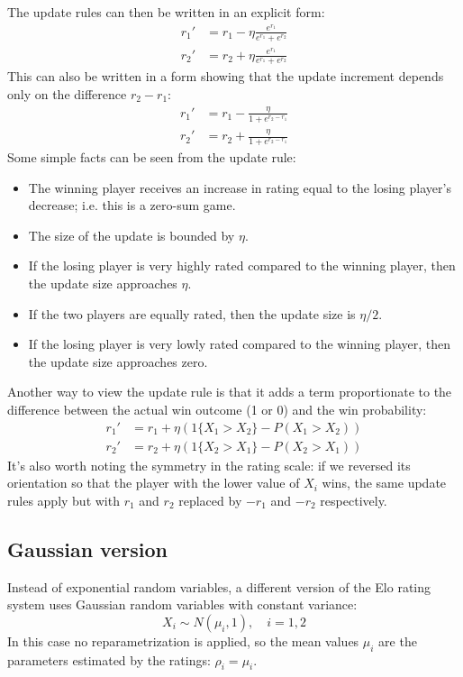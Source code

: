 \documentclass{article}
\begin{document}
	The update rules can then be written in an explicit form:
	\begin{align*}
	r_1' &= r_1 - \eta\frac{e^{r_1}}{e^{r_1} + e^{r_2}} \\
	r_2' &= r_2 + \eta\frac{e^{r_1}}{e^{r_1} + e^{r_2}} 
	\end{align*}
	This can also be written in a form showing that the update increment depends only on the difference $r_2 - r_1$:
	\begin{align*}
	r_1' &= r_1 - \frac{\eta}{1 + e^{r_2 - r_1}} \\
	r_2' &= r_2 + \frac{\eta}{1 + e^{r_2 - r_1}} 
	\end{align*}
	Some simple facts can be seen from the update rule: 
	\begin{itemize}
		\item The winning player receives an increase in rating equal to the losing player's decrease; i.e. this is a zero-sum game.
		\item The size of the update is bounded by $\eta$.
		\item If the losing player is very highly rated compared to the winning player, then the update size approaches $\eta$.
		\item If the two players are equally rated, then the update size is $\eta / 2$.
		\item If the losing player is very lowly rated compared to the winning player, then the update size approaches zero. 
	\end{itemize}
	Another way to view the update rule is that it adds a term proportionate to the difference between the actual win outcome (1 or 0) and the win probability:
	\begin{align*}
	r_1' &= r_1 + \eta(1\{X_1 > X_2\} - P(X_1 > X_2)) \\
	r_2' &= r_2 + \eta(1\{X_2 > X_1\} - P(X_2 > X_1))
	\end{align*}
	It's also worth noting the symmetry in the rating scale: if we reversed its orientation so that the player with the lower value of $X_i$ wins,
	the same update rules apply but with $r_1$ and $r_2$ replaced by $-r_1$ and $-r_2$ respectively.
	
	\subsection{Gaussian version}
	
	Instead of exponential random variables, a different version of the Elo rating system uses Gaussian random variables with constant variance:
	$$X_i \sim N(\mu_i, 1),\quad i=1, 2$$
	In this case no reparametrization is applied, so the mean values $\mu_i$ are the parameters estimated by the ratings: $\rho_i = \mu_i$.
	
\end{document}
